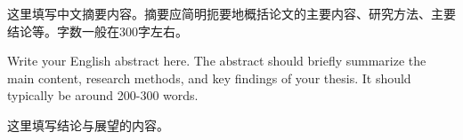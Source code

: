 \documentclass{styles/jouthesis}
\begin{document}
\makecover

\begin{cnabstract}
    这里填写中文摘要内容。摘要应简明扼要地概括论文的主要内容、研究方法、主要结论等。字数一般在300字左右。
\end{cnabstract}

\begin{enabstract}
    Write your English abstract here. The abstract should briefly summarize the main content, research methods, and key findings of your thesis. It should typically be around 200-300 words.
\end{enabstract}

\tableofcontents


\mainmatter




这里填写结论与展望的内容。

\JOUAcknowledgementChapter


\JOUPrintBibliography

\appendix

\end{document}
